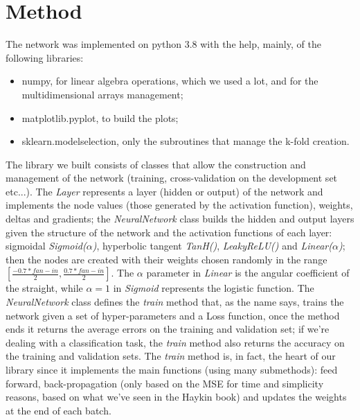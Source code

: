 \section{Method}
The network was implemented on python 3.8 with the help, mainly, of the following libraries:
\begin{itemize}
    \item numpy, for linear algebra operations, which we used a lot, and for the multidimensional arrays management;
    \item matplotlib.pyplot, to build the plots;
    \item sklearn.modelselection, only the subroutines that manage the k-fold creation.
\end{itemize}
The library we built consists of classes that allow the construction and management of the network (training, cross-validation on the development set etc...). The \textit{Layer} represents a layer (hidden or output) of the network and implements the node values (those generated by the activation function), weights, deltas and gradients; the \textit{NeuralNetwork} class builds the hidden and output layers given the structure of the network and the activation functions of each layer: sigmoidal \textit{Sigmoid($\alpha$)}, hyperbolic tangent \textit{TanH()}, \textit{LeakyReLU()} and \textit{Linear($\alpha$)}; then the nodes are created with their weights chosen randomly in the range $[\frac{-0.7*fan-in}{2}, \frac{0.7*fan-in}{2}]$. The $\alpha$ parameter in \textit{Linear} is the angular coefficient of the straight, while $\alpha=1$ in \textit{Sigmoid} represents the logistic function. The \textit{NeuralNetwork} class defines the \textit{train} method that, as the name says, trains the network given a set of hyper-parameters and a Loss function, once the method ends it returns the average errors on the training and validation set; if we're dealing with a classification task, the \textit{train} method also returns the accuracy on the training and validation sets. The \textit{train} method is, in fact, the heart of our library since it implements the main functions (using many submethods): feed forward, back-propagation (only based on the MSE for time and simplicity reasons, based on what we've seen in the Haykin book\cite{haykin2009neural}) and updates the weights at the end of each batch.

